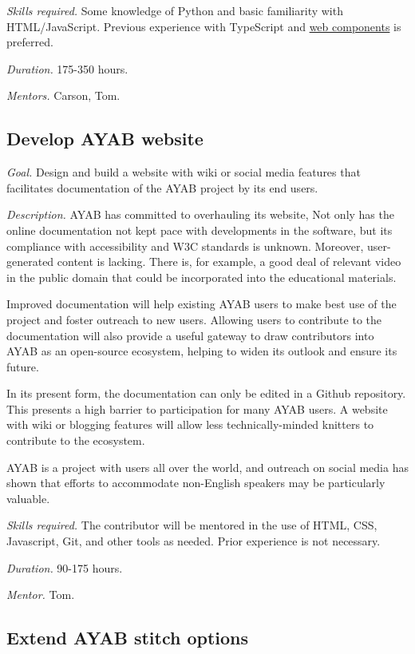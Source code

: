 \documentclass{article}
\begin{document}
\textit{Skills required.} Some knowledge of Python and basic familiarity with HTML/JavaScript. Previous experience with TypeScript and \href{https://developer.mozilla.org/en-US/docs/Web/API/Web_components}{web components} is preferred.

\textit{Duration.} 175-350 hours. 

\textit{Mentors.} Carson, Tom.


\subsection{Develop AYAB website} 

\textit{Goal.} Design and build a website with wiki or social media features that facilitates documentation of the AYAB project by its end users. 

\textit{Description.} AYAB has committed to overhauling its website, Not only has the online documentation not kept pace with developments in the software, but its compliance with accessibility and W3C standards is unknown. Moreover, user-generated content is lacking. There is, for example, a good deal of relevant video in the public domain that could be incorporated into the educational materials.

Improved documentation will help existing AYAB users to make best use of the project and foster outreach to new users. Allowing users to contribute to the documentation will also provide a useful gateway to draw contributors into AYAB as an open-source ecosystem, helping to widen its outlook and ensure its future.

In its present form, the documentation can only be edited in a Github repository. This presents a high barrier to participation for many AYAB users. A website with wiki or blogging features will allow less technically-minded knitters to contribute to the ecosystem. 

AYAB is a project with users all over the world, and outreach on social media has shown that efforts to accommodate non-English speakers may be particularly valuable.

\textit{Skills required.} The contributor will be mentored in the use of HTML, CSS, Javascript, Git, and other tools as needed. Prior experience is not necessary.

\textit{Duration.} 90-175 hours. 

\textit{Mentor.} Tom.


\subsection{Extend AYAB stitch options} 
\end{document}
